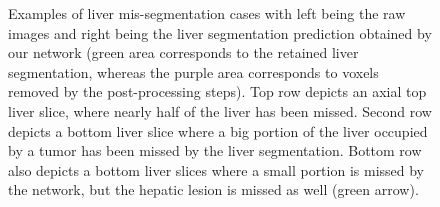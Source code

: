 \begin{figure}[ht!]
\begin{mdframed}[backgroundcolor=blue!50,linecolor=blue!50]
\begin{minipage}{0.45\linewidth}
		\end{minipage}
		\caption{Examples of liver mis-segmentation cases with left being the raw images and right being the liver segmentation prediction obtained by our  network (green area corresponds to the retained liver segmentation, whereas the purple area corresponds to voxels removed by the post-processing steps). Top row depicts an axial top liver slice, where nearly half of the liver has been missed. Second row depicts a bottom liver slice where a big portion of the liver occupied by a tumor has been missed by the liver segmentation. Bottom row also depicts a bottom liver slices where a small portion is missed by the network, but the hepatic lesion is missed as well (green arrow).}
		\label{fig:LITS_networkMisSeg_extremSlices}
	\end{mdframed}
\end{figure}

